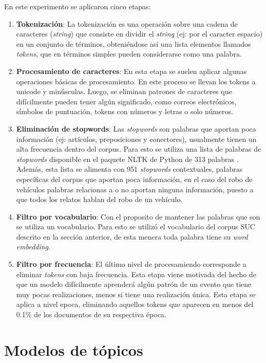 \documentclass[letterpaper,12pt,oneside]{book} %
\begin{document}
En este experimento se aplicaron cinco etapas:
\begin{enumerate}
\item \textbf{Tokenización}: La tokenización es una operación sobre una cadena de caracteres (\textit{string}) que consiste en dividir el \textit{string} (ej: por el caracter espacio) en un conjunto de términos, obteniéndose así una lista elementos llamados \textit{tokens}, que en términos simples pueden considerarse como una palabra.
\item \textbf{Procesamiento de caracteres}: En esta etapa se suelen aplicar algunas operaciones básicas de procesamiento. En este proceso se llevan los tokens a unicode y minúsculas. Luego, se eliminan patrones de caracteres que difícilmente pueden tener algún significado, como correos electrónicos, símbolos de puntuación, tokens con números y letras o solo números. 
\item \textbf{Eliminación de stopwords}: Las \textit{stopwords} \citep{wilbur1992automatic} son palabras que aportan poca información (ej: artículos, preposiciones y conectores), usualmente tienen un alta frecuencia dentro del corpus. Para esto se utiliza una lista de palabras de \textit{stopwords} disponible en el paquete NLTK de Python de 313 palabras \citep{bird2009natural}. Además, esta lista se alimenta con 951 \textit{stopwords} contextuales, palabras específicas del corpus que aportan poca información, en el caso del robo de vehículos palabras relacionas a  o  no aportan ninguna información, puesto a que todos los relatos hablan del robo de un vehículo. 
\item \textbf{Filtro por vocabulario}: Con el proposito de mantener las palabras que son  se utiliza un vocabulario. Para esto se utilizó el vocabulario del corpus SUC descrito en la sección anterior, de esta menera toda palabra tiene su \textit{word embedding}. 
\item \textbf{Filtro por frecuencia}: El último nivel de procesamiendo corresponde a eliminar \textit{tokens} con baja frecuencia. Esta etapa viene motivada del hecho de que un modelo difícilmente aprenderá algún patrón de un evento que tiene muy pocas realizaciones, menos si tiene una realización única. Esta etapa se aplica a nivel epoca, eliminando aquellos tokens que aparecen en menos del 0.1\% de los documentos de su respectiva época.
\end{enumerate}

\section{Modelos de tópicos}
\label{sec:model_selected}
\end{document}
